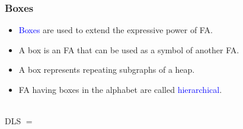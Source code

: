 \documentclass{beamer}
\newcommand{\hlbl}[1]{\textcolor{blue}{#1}}
\begin{document}

 
\begin{frame}
\frametitle{Boxes}

\begin{itemize}
		\item \hlbl{Boxes} are used to extend the expressive power of FA.
		\item A box is an FA that can be used as a symbol of another FA.
		\item A box represents repeating subgraphs of a heap.
		\item FA having boxes in the alphabet are called \hlbl{hierarchical}.
	\end{itemize}
		\vspace{-0.8cm}
		\centering \\
		\vspace{0.7cm}
		\centering DLS $=$ \\
		\vspace{-0.8cm}
		\centering 
\end{frame}

\end{document}
